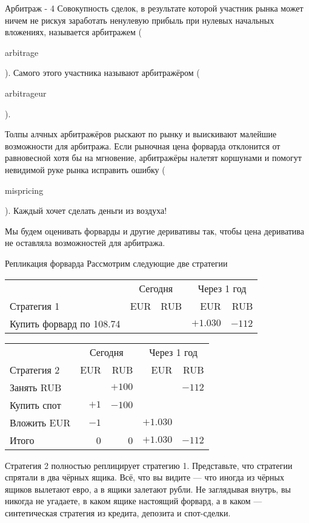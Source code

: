 \documentclass{beamer}
\newcommand{\en}[1]{\begin{otherlanguage}{english}#1\end{otherlanguage}}
\begin{document}
\begin{frame}{Арбитраж - 4}
\justify
Совокупность сделок, в результате которой участник рынка может ничем не рискуя заработать ненулевую прибыль при нулевых начальных вложениях, называется \alert{арбитражем} (\en{arbitrage}). Самого этого участника называют арбитражёром (\en{arbitrageur}).

\justify
Толпы алчных арбитражёров рыскают по рынку и выискивают малейшие возможности для арбитража. Если рыночная цена форварда отклонится от равновесной хотя бы на мгновение, арбитражёры налетят коршунами и помогут невидимой руке рынка исправить ошибку (\en{mispricing}). Каждый хочет сделать деньги из воздуха! 

\justify
Мы будем оценивать форварды и другие деривативы так, чтобы цена дериватива не оставляла возможностей для арбитража.
\end{frame}



\begin{frame}{Репликация форварда}
\justify
Рассмотрим следующие две стратегии

\justify
\small{
\begin{tabular}{l|r|r|r|r}
 & \multicolumn{2}{c|}{Сегодня} & \multicolumn{2}{c}{Через 1 год} \\ \cline{2-5}
Стратегия 1& EUR & RUB & EUR & RUB \\ \hline
Купить форвард по 108.74&                              &                                & $+1.030$ & $-112$
\end{tabular}
}

\justify
\small{
\begin{tabular}{l|r|r|r|r}
& \multicolumn{2}{c|}{Сегодня} & \multicolumn{2}{c}{Через 1 год} \\ \cline{2-5}
Стратегия 2 & EUR & RUB & EUR & RUB \\ \hline
Занять RUB &                             & $+100$ &                    & $-112$ \\
Купить спот        & $+1$ & $-100$  &                     &                                  \\
Вложить EUR & $-1$  &                                  & $+1.030$ & \\  \hline
Итого & 0 & 0 &  $+1.030$ & $-112$
\end{tabular}
}

\justify
Стратегия 2 полностью \alert{реплицирует} стратегию 1. Представьте, что стратегии спрятали в два чёрных ящика. Всё, что вы видите --- что иногда из чёрных ящиков вылетают евро, а в ящики залетают рубли. Не заглядывая внутрь, вы никогда не угадаете, в каком ящике настоящий форвард, а в каком --- синтетическая стратегия из кредита, депозита и спот-сделки.
\end{frame}
\end{document}
